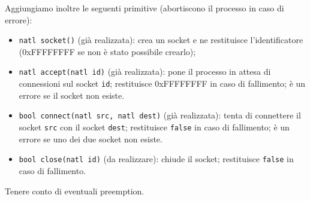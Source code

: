 Aggiungiamo inoltre le seguenti primitive (abortiscono il processo in caso di errore):
\begin{itemize}
  \item \verb|natl socket()| (gi\`a realizzata): crea un socket e ne restituisce l'identificatore
    (0xFFFFFFFF se non \`e stato possibile crearlo);
  \item \verb|natl accept(natl id)| (gi\`a realizzata): pone il processo in attesa di connessioni
    sul socket \verb|id|; restituisce 0xFFFFFFFF in caso di fallimento;
    \`e un errore se il socket non esiste.
  \item \verb|bool connect(natl src, natl dest)| (gi\`a realizzata):
    tenta di connettere il socket \verb|src| con il socket \verb|dest|; restituisce \verb|false|
    in caso di fallimento; \`e un errore se uno dei due socket non esiste.
  \item \verb|bool close(natl id)| (da realizzare): chiude il socket; restituisce \verb|false| in caso di fallimento.
\end{itemize}
Tenere conto di eventuali preemption.

